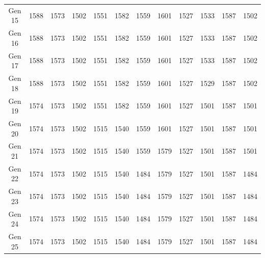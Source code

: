 \documentclass[12pt]{article}
\begin{document}
\begin{table}[h]
\begin{adjustbox}{max width=0.97\textwidth}
\begin{tabular}{*{12}{c}}
        Gen 15 & 1588 & 1573 & 1502 & 1551 & 1582 & 1559 & 1601 & 1527 & 1533 & 1587 & 1502 \\
        Gen 16 & 1588 & 1573 & 1502 & 1551 & 1582 & 1559 & 1601 & 1527 & 1533 & 1587 & 1502 \\
        Gen 17 & 1588 & 1573 & 1502 & 1551 & 1582 & 1559 & 1601 & 1527 & 1533 & 1587 & 1502 \\
        Gen 18 & 1588 & 1573 & 1502 & 1551 & 1582 & 1559 & 1601 & 1527 & 1529 & 1587 & 1502 \\
        Gen 19 & 1574 & 1573 & 1502 & 1551 & 1582 & 1559 & 1601 & 1527 & 1501 & 1587 & 1501 \\
        Gen 20 & 1574 & 1573 & 1502 & 1515 & 1540 & 1559 & 1601 & 1527 & 1501 & 1587 & 1501 \\
        Gen 21 & 1574 & 1573 & 1502 & 1515 & 1540 & 1559 & 1579 & 1527 & 1501 & 1587 & 1501 \\
        Gen 22 & 1574 & 1573 & 1502 & 1515 & 1540 & 1484 & 1579 & 1527 & 1501 & 1587 & 1484 \\
        Gen 23 & 1574 & 1573 & 1502 & 1515 & 1540 & 1484 & 1579 & 1527 & 1501 & 1587 & 1484 \\
        Gen 24 & 1574 & 1573 & 1502 & 1515 & 1540 & 1484 & 1579 & 1527 & 1501 & 1587 & 1484 \\
        Gen 25 & 1574 & 1573 & 1502 & 1515 & 1540 & 1484 & 1579 & 1527 & 1501 & 1587 & 1484 \\
        \bottomrule
        \end{tabular}
    \end{adjustbox}
\end{table}
\end{document}
